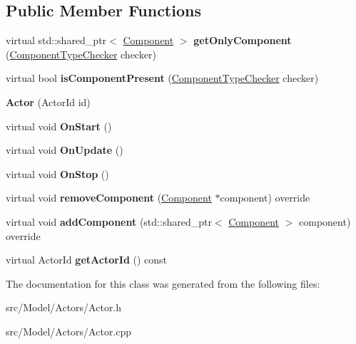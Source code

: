 \subsection*{Public Member Functions}
\begin{DoxyCompactItemize}
\item 
virtual std\+::shared\+\_\+ptr$<$ \hyperlink{classComponent}{Component} $>$ {\bfseries get\+Only\+Component} (\hyperlink{classComponentTypeChecker}{Component\+Type\+Checker} checker)\hypertarget{classActor_a975ec063e7e6058541057e65a10d7c5b}{}\label{classActor_a975ec063e7e6058541057e65a10d7c5b}

\item 
virtual bool {\bfseries is\+Component\+Present} (\hyperlink{classComponentTypeChecker}{Component\+Type\+Checker} checker)\hypertarget{classActor_a4e94dec1e0c20048e28213e585f875db}{}\label{classActor_a4e94dec1e0c20048e28213e585f875db}

\item 
{\bfseries Actor} (Actor\+Id id)\hypertarget{classActor_a7fea1ceaf2fbd6e08c058fdad2108a06}{}\label{classActor_a7fea1ceaf2fbd6e08c058fdad2108a06}

\item 
virtual void {\bfseries On\+Start} ()\hypertarget{classActor_a926354cddd1e36f1c887144deaa9e9e2}{}\label{classActor_a926354cddd1e36f1c887144deaa9e9e2}

\item 
virtual void {\bfseries On\+Update} ()\hypertarget{classActor_a163d4b04407ff2d748094fca4c472e85}{}\label{classActor_a163d4b04407ff2d748094fca4c472e85}

\item 
virtual void {\bfseries On\+Stop} ()\hypertarget{classActor_a79bbc72a5eeb4eeba06a4ca24da2ef8a}{}\label{classActor_a79bbc72a5eeb4eeba06a4ca24da2ef8a}

\item 
virtual void {\bfseries remove\+Component} (\hyperlink{classComponent}{Component} $\ast$component) override\hypertarget{classActor_ad5b860c18af10e1e27a546100a21ac7b}{}\label{classActor_ad5b860c18af10e1e27a546100a21ac7b}

\item 
virtual void {\bfseries add\+Component} (std\+::shared\+\_\+ptr$<$ \hyperlink{classComponent}{Component} $>$ component) override\hypertarget{classActor_ac1a9cb85ed2193374ecec0e8e1f0778e}{}\label{classActor_ac1a9cb85ed2193374ecec0e8e1f0778e}

\item 
virtual Actor\+Id {\bfseries get\+Actor\+Id} () const \hypertarget{classActor_a28e3c3abb4b2f09027ff2f3805a02895}{}\label{classActor_a28e3c3abb4b2f09027ff2f3805a02895}

\end{DoxyCompactItemize}


The documentation for this class was generated from the following files\+:\begin{DoxyCompactItemize}
\item 
src/\+Model/\+Actors/Actor.\+h\item 
src/\+Model/\+Actors/Actor.\+cpp\end{DoxyCompactItemize}
